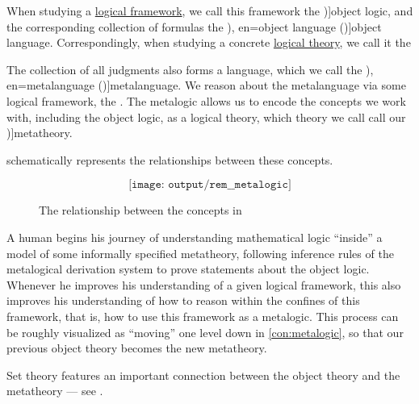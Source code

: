 \begin{concept}\label{con:metalogic}
  When studying a \hyperref[def:logical_framework]{logical framework}, we call this framework the \term[en=object logic (\cite[3]{Kleene2002Logic})]{object logic}, and the corresponding collection of formulas the \term[ru=предметный язык (\cite[35]{Герасимов2011}), en=object language (\cite[3]{Kleene2002Logic})]{object language}. Correspondingly, when studying a concrete \hyperref[def:logical_theory]{logical theory}, we call it the 

  The collection of all judgments also forms a language, which we call the \term[ru=метаязык (\cite[35]{Герасимов2011}), en=metalanguage (\cite[3]{Kleene2002Logic})]{metalanguage}. We reason about the metalanguage via some logical framework, the . The metalogic allows us to encode the concepts we work with, including the object logic, as a logical theory, which theory we call call our \term[en=metatheory (\cite[199]{Kleene2002Logic})]{metatheory}.

   schematically represents the relationships between these concepts.

  \begin{figure}[!ht]
    \begin{equation*}
      \texttt{[image: output/rem\_\_metalogic]}
    \end{equation*}
    \caption{The relationship between the concepts in }\label{fig:con:metalogic}
  \end{figure}
\end{concept}
\begin{comments}
  \item A human begins his journey of understanding mathematical logic \enquote{inside} a model of some informally specified metatheory, following inference rules of the metalogical derivation system to prove statements about the object logic. Whenever he improves his understanding of a given logical framework, this also improves his understanding of how to reason within the confines of this framework, that is, how to use this framework as a metalogic. This process can be roughly visualized as \enquote{moving} one level down in \cref{con:metalogic}, so that our previous object theory becomes the new metatheory.

  \item Set theory features an important connection between the object theory and the metatheory --- see .
\end{comments}

